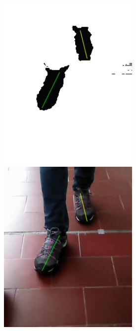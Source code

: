 \documentclass[a4paper]{report}
\begin{document}
\begin{figure}[H]
\centering
\begin{minipage}{.5\textwidth}
  \centering
    \includegraphics[width=0.61\textwidth]{images/building/coords/coordsOriginal.png}
\end{minipage}%
\begin{minipage}{.5\textwidth}
  \centering
    \includegraphics[width=0.61\textwidth]{images/building/coords/coordsRGB.png}
\end{minipage}%
\end{figure}
\end{document}
